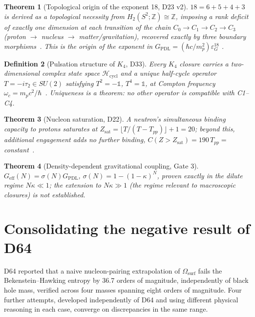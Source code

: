 \documentclass[12pt,a4paper]{article}
\newtheorem{theorem}{Theorem}[section]
\newtheorem{definition}[theorem]{Definition}
\newcommand{\Kfour}{K_4}
\newcommand{\hb}{\hbar}
\newcommand{\Omegasurf}{\Omega_{\mathrm{surf}}}
\newcommand{\sig}{\sigma}
\newcommand{\kap}{\kappa}
\newcommand{\GPDL}{G_{\mathrm{PDL}}}
\newcommand{\Geff}{G_{\mathrm{eff}}}
\newcommand{\Hcycl}{\mathcal{H}_{\mathrm{cycl}}}
\newcommand{\Zsat}{Z_{\mathrm{sat}}}
\begin{document}
\begin{theorem}[Topological origin of the exponent 18, D23 v2]
\label{thm:D23}
$18=6+5+4+3$ is derived as a topological necessity from
$H_2(S^2;\mathbb{Z})\cong\mathbb{Z}$, imposing a rank deficit of
exactly one dimension at each transition of the chain
$C_0\to C_1\to C_2\to C_3$ (proton $\to$ nucleus $\to$
matter/gravitation), recovered exactly by three boundary
morphisms~\citep{PDL_D23v2_2026}. This is the origin of the
exponent in $\GPDL=(\hb c/m_p^2)\varepsilon_G^{18}$
\citep{PDL_D43_2026,PDL_D44_2026}.
\end{theorem}

\begin{definition}[Pulsation structure of $\Kfour$, D33]
\label{def:D33}
Every $\Kfour$ closure carries a two-dimensional complex state
space $\Hcycl$ and a unique half-cycle operator $T=-i\tau_2\in
SU(2)$ satisfying $T^2=-\mathbb{1}$, $T^4=\mathbb{1}$, at Compton
frequency $\omega_c=m_pc^2/\hb$~\citep{PDL_D33_2026}. Uniqueness is
a theorem: no other operator is compatible with C1--C4.
\end{definition}

\begin{theorem}[Nucleon saturation, D22]
\label{thm:Zsat}
A neutron's simultaneous binding capacity to protons saturates at
$\Zsat=\lfloor T/(T-T_{pp})\rfloor+1=20$; beyond this, additional
engagement adds no further binding, $C(Z>\Zsat)=190\,T_{pp}=$
constant~\citep{D22_nuclear_stability}.
\end{theorem}

\begin{theorem}[Density-dependent gravitational coupling, Gate 3]
\label{thm:Gate3}
$\Geff(N)=\sig(N)\GPDL$, $\sig(N)=1-(1-\kap)^N$, proven exactly in
the dilute regime $N\kap\ll1$; the extension to $N\kap\gg1$ (the
regime relevant to macroscopic closures) is not established.
\end{theorem}

\section{Consolidating the negative result of D64}
\label{sec:consolidation}

D64 reported that a naive nucleon-pairing extrapolation of
$\Omegasurf$ fails the Bekenstein--Hawking entropy by 36.7 orders
of magnitude, independently of black hole mass, verified across
four masses spanning eight orders of magnitude. Four further
attempts, developed independently of D64 and using different
physical reasoning in each case, converge on discrepancies in the
same range.
\end{document}
